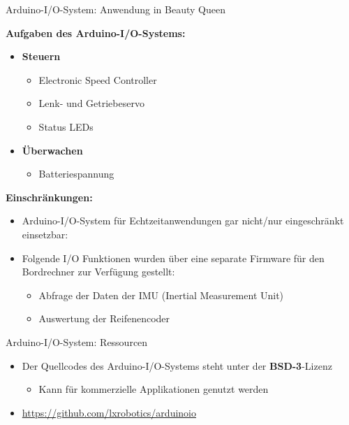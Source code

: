 \documentclass{beamer}
\begin{document}
\begin{frame}{Arduino-I/O-System: Anwendung in Beauty Queen}
\begin{large}\textbf{Aufgaben des Arduino-I/O-Systems:}\end{large}
 \begin{itemize}
  \item \textbf{Steuern}
  \begin{itemize}
   \item Electronic Speed Controller
   \item Lenk- und Getriebeservo
   \item Status LEDs
  \end{itemize}
 \end{itemize}
 \begin{itemize}
  \item \textbf{\"Uberwachen}
  \begin{itemize}
   \item Batteriespannung
  \end{itemize}
 \end{itemize}
\begin{large}\textbf{Einschr\"ankungen:}\end{large}
\begin{itemize}
 \item Arduino-I/O-System f\"ur Echtzeitanwendungen gar nicht/nur eingeschr\"ankt einsetzbar: 
 \item Folgende I/O Funktionen wurden \"uber eine separate Firmware f\"ur den Bordrechner zur Verf\"ugung gestellt:
 \begin{itemize}
  \item Abfrage der Daten der IMU (Inertial Measurement Unit)
  \item Auswertung der Reifenencoder
 \end{itemize}
\end{itemize}
\end{frame}
\begin{frame}{Arduino-I/O-System: Ressourcen}
	\begin{itemize}
		\item Der Quellcodes des Arduino-I/O-Systems steht unter der \textbf{BSD-3}-Lizenz
		\begin{itemize}
			\item Kann f\"ur kommerzielle Applikationen genutzt werden
		\end{itemize}
	\end{itemize}
	\begin{itemize}
		\item \url{https://github.com/lxrobotics/arduinoio}
	\end{itemize}
\end{frame}
\end{document}
